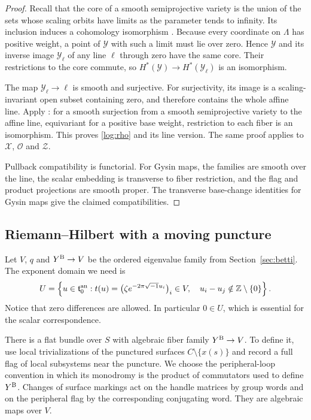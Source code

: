 \begin{proof}
Recall that the core of a smooth semiprojective variety is the union
of the sets whose scaling orbits have limits as the parameter tends
to infinity.  Its inclusion induces a cohomology isomorphism
\cite[Theorem~1.3.1]{HRV2015}.  Because every coordinate on $\Lambda$
has positive weight, a point of $\mathcal Y$ with such a limit must
lie over zero.  Hence $\mathcal Y$ and its inverse image
$\mathcal Y_\ell$ of any line $\ell$ through zero have the same core.
Their restrictions to the core commute, so
$H^*(\mathcal Y)\to H^*(\mathcal Y_\ell)$ is an isomorphism.

The map $\mathcal Y_\ell\to\ell$ is smooth and surjective.  For
surjectivity, its image is a scaling-invariant open subset containing
zero, and therefore contains the whole affine line.  Apply
\cite[Corollary~1.3.3]{HRV2015}: for a smooth surjection from a smooth
semiprojective variety to the affine line, equivariant for a positive
base weight, restriction to each fiber is an isomorphism.  This proves
\eqref{log:rho} and its line version.  The same proof applies to
$\mathcal X$, $\mathcal O$ and $\mathcal Z$.

Pullback compatibility is functorial.  For Gysin maps, the families
are smooth over the line, the scalar embedding is transverse to fiber
restriction, and the flag and product projections are smooth proper.
The transverse base-change identities for Gysin maps give the claimed
compatibilities.
\end{proof}

\subsection{Riemann--Hilbert with a moving puncture}

Let $V$, $q$ and $Y^{\rm B}\to V$ be the ordered eigenvalue family from
Section~\ref{sec:betti}.  The exponent domain we need is
\begin{equation}
 U=\left\{u\in\mathfrak t_0^{\rm an}:
 t(u)=\bigl(\zeta e^{-2\pi\sqrt{-1}u_i}\bigr)_i\in V,\quad
 u_i-u_j\notin\mathbb Z\setminus\{0\}\right\}.
 \label{log:nonresonance}
\end{equation}
Notice that zero differences are allowed.  In particular $0\in U$,
which is essential for the scalar correspondence.

There is a flat bundle over $S$ with algebraic fiber family
$Y^{\rm B}\to V$.  To define it, use local trivializations of the
punctured surfaces $C\setminus\{x(s)\}$ and record a full flag of local
subsystems near the puncture.  We choose the peripheral-loop convention
in which its monodromy is the product of commutators used to define
$Y^{\rm B}$.  Changes of surface markings act on the handle matrices
by group words and on the peripheral flag by the corresponding
conjugating word.  They are algebraic maps over $V$.

